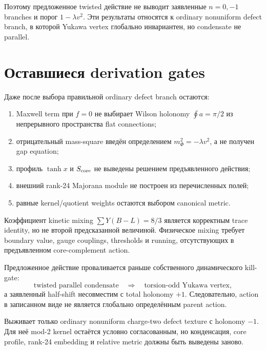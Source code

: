 Поэтому предложенное twisted действие не выводит заявленные
\(n=0,-1\) branches и порог \(1-\lambda v^2\). Эти результаты относятся к
ordinary nonuniform defect branch, в которой Yukawa vertex глобально
инвариантен, но condensate не parallel.

\section{Оставшиеся derivation gates}

Даже после выбора правильной ordinary defect branch остаются:
\begin{enumerate}
 \item Maxwell term при \(f=0\) не выбирает Wilson holonomy
 \(\oint a=\pi/2\) из непрерывного пространства flat connections;
 \item отрицательный mass-square введён определением
 \(m_\Phi^2=-\lambda v^2\), а не получен gap equation;
 \item профиль \(\tanh x\) и \(S_{\rm core}\) не выведены решением
 предъявленного действия;
 \item внешний rank-24 Majorana module не построен из перечисленных полей;
 \item равные kernel/quotient weights остаются выбором canonical metric.
\end{enumerate}

Коэффициент kinetic mixing
\(\sum Y(B-L)=8/3\) является корректным trace identity, но не второй
предсказанной величиной. Физическое mixing требует boundary value, gauge
couplings, thresholds и running, отсутствующих в предъявленном
core-complement action.

\begin{proposition}
Предложенное действие проваливается раньше собственного динамического
kill-gate:
\begin{equation}
 \text{twisted parallel condensate}
 \quad\Longrightarrow\quad
 \text{torsion-odd Yukawa vertex},
\end{equation}
а заявленный half-shift несовместим с total holonomy \(+1\).
Следовательно, action в записанном виде не является глобально определённым
parent action.

Выживает только ordinary nonuniform charge-two defect texture с holonomy
\(-1\). Для неё mod-2 kernel остаётся условно согласованным, но
конденсация, core profile, rank-24 embedding и relative metric должны быть
выведены заново.
\end{proposition}

